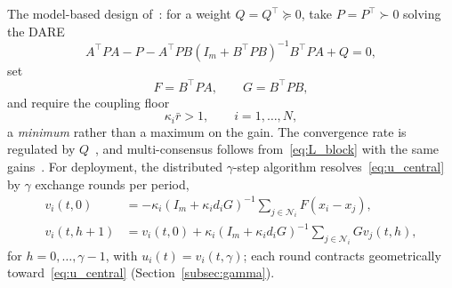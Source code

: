 \documentclass[final,5p,times]{elsarticle}
\theoremstyle{plain}
\theoremstyle{definition}
\theoremstyle{remark}
\begin{document}
The model-based design of~\cite[Thm.~3.1]{cacace2024}: for a weight $Q = Q^\top \succeq 0$, take $P = P^\top \succ 0$ solving the DARE
\begin{equation}
A^\top P A - P - A^\top PB(I_m + B^\top PB)^{-1}B^\top PA + Q = 0,
\label{eq:dare}
\end{equation}
set
\begin{equation}
F = B^\top P A, \qquad G = B^\top P B,
\label{eq:FG_dare}
\end{equation}
and require the coupling floor
\begin{equation}
\kappa_i \bar{r} > 1, \qquad i = 1,\ldots,N,
\label{eq:coupling}
\end{equation}
a \emph{minimum} rather than a maximum on the gain. The convergence rate is regulated by $Q$~\cite[Remark~3.2]{cacace2024}, and multi-consensus follows from~\eqref{eq:L_block} with the same gains~\cite[Thm.~4.1]{cacace2024}. For deployment, the distributed $\gamma$-step algorithm resolves~\eqref{eq:u_central} by $\gamma$ exchange rounds per period,
\begin{align}
v_i(t,0) &= -\kappa_i(I_m + \kappa_i d_i G)^{-1} \!\sum_{j \in \mathcal{N}_i}\! F(x_i - x_j), \label{eq:dist_init} \\
v_i(t,h{+}1) &= v_i(t,0) + \kappa_i(I_m + \kappa_i d_i G)^{-1} \!\sum_{j \in \mathcal{N}_i}\! Gv_j(t,h), \label{eq:dist_iter}
\end{align}
for $h = 0,\ldots,\gamma-1$, with $u_i(t) = v_i(t,\gamma)$; each round contracts geometrically toward~\eqref{eq:u_central} (Section~\ref{subsec:gamma}).
\end{document}
